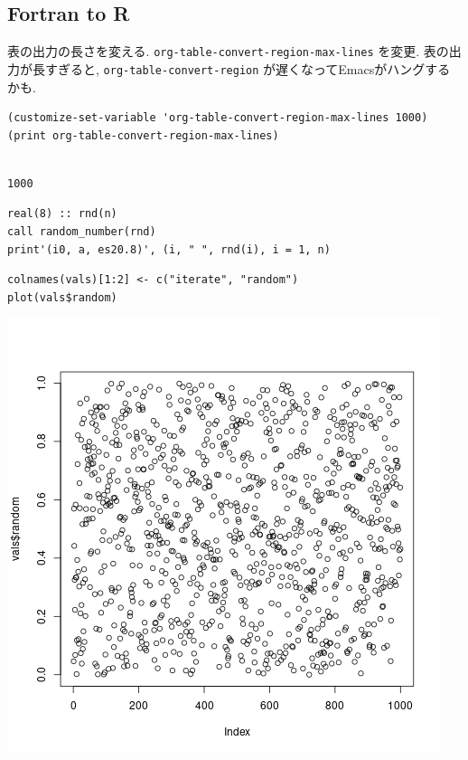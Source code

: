 \documentclass[lualatex,a4paper,12pt,report,ja=standard]{bxjsarticle}
\begin{document}
\subsection{Fortran to R}
\label{sec:org53cce04}
表の出力の長さを変える.
\texttt{org-table-convert-region-max-lines} を変更. 表の出力が長すぎると, \texttt{org-table-convert-region} が遅くなってEmacsがハングするかも.
\begin{verbatim}
(customize-set-variable 'org-table-convert-region-max-lines 1000)
(print org-table-convert-region-max-lines)
\end{verbatim}

\begin{verbatim}

1000
\end{verbatim}


\begin{verbatim}
real(8) :: rnd(n)
call random_number(rnd)
print'(i0, a, es20.8)', (i, " ", rnd(i), i = 1, n)
\end{verbatim}

\begin{verbatim}
colnames(vals)[1:2] <- c("iterate", "random")
plot(vals$random)
\end{verbatim}

\begin{center}
\includegraphics[width=.9\linewidth]{rand_num_plot.png}
\end{center}
\end{document}
